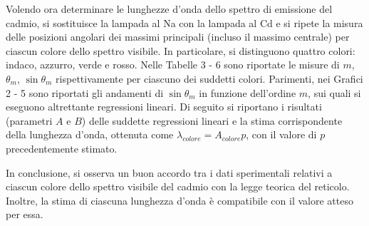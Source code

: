 \documentclass{article}
\begin{document}
Volendo ora determinare le lunghezze d'onda dello spettro di emissione del cadmio, si sostituisce la lampada al Na con la lampada al Cd e si ripete la misura delle posizioni angolari dei massimi principali (incluso il massimo centrale) per ciascun colore dello spettro visibile.
In particolare, si distinguono quattro colori: indaco, azzurro, verde e rosso. Nelle Tabelle 3 - 6 sono riportate le misure di $m$, $\theta_m$, $\sin \theta_m$ rispettivamente per ciascuno dei suddetti colori.
Parimenti, nei Grafici 2 - 5 sono riportati gli andamenti di $\sin \theta_m$ in funzione dell'ordine $m$, sui quali si eseguono altrettante regressioni lineari.
Di seguito si riportano i risultati (parametri $A$ e $B$) delle suddette regressioni lineari e la stima corrispondente della lunghezza d'onda, ottenuta come $\lambda_{colore}= A_{colore} p$, con il valore di $p$ precedentemente stimato.

In conclusione, si osserva un buon accordo tra i dati sperimentali relativi a ciascun colore dello spettro visibile del cadmio con la legge teorica del reticolo. Inoltre, la stima di ciascuna lunghezza d'onda è compatibile con il valore atteso per essa.



 
	
	
\end{document}
